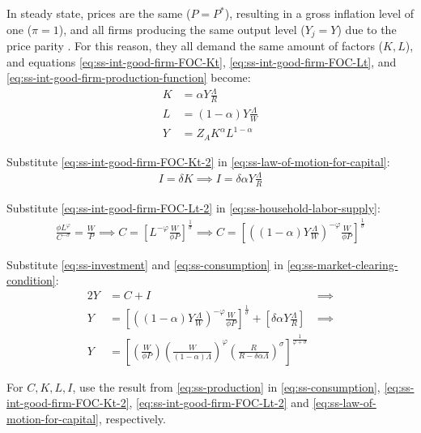 \documentclass[
thesis.tex
]{subfiles}
\begin{document}
	In steady state, prices are the same ($P = P^\ast$), resulting in a gross inflation level of one ($\pi=1$), and all firms producing the same output level ($Y_j=Y$) due to the price parity \cite[Lecture 13, p.12]{solis-garcia_ucb_2022}. For this reason, they all demand the same amount of factors ($K,L$), and equations \ref{eq:ss-int-good-firm-FOC-Kt}, \ref{eq:ss-int-good-firm-FOC-Lt}, and \ref{eq:ss-int-good-firm-production-function} become:
	\begin{align}
		K &= \alpha Y \frac{\Lambda}{R} \label{eq:ss-int-good-firm-FOC-Kt-2} \\
		L &= (1-\alpha) Y \frac{\Lambda}{W} \label{eq:ss-int-good-firm-FOC-Lt-2} \\
		Y &= Z_{A} K^\alpha L^{1-\alpha} \label{eq:ss-int-good-firm-production-function-2}
	\end{align}
	
	Substitute \ref{eq:ss-int-good-firm-FOC-Kt-2} in \ref{eq:ss-law-of-motion-for-capital}:
	\begin{align}
		\label{eq:ss-investment}
		I = \delta K \implies I = \delta \alpha Y \frac{\Lambda}{R}
	\end{align}
	
	Substitute \ref{eq:ss-int-good-firm-FOC-Lt-2} in \ref{eq:ss-household-labor-supply}:
	\begin{align}
		\label{eq:ss-consumption}
		\frac{\phi L^{\varphi}}{C^{-\sigma}} = \frac{W}{P}
		\implies
		C = \left[ L^{-\varphi} \frac{W}{\phi P} \right]^{\frac{1}{\sigma}}
		\implies
		C = \left[ \left( (1-\alpha) Y \frac{\Lambda}{W} \right)^{-\varphi} \frac{W}{\phi P} \right]^{\frac{1}{\sigma}}
	\end{align}
	
	Substitute \ref{eq:ss-investment} and \ref{eq:ss-consumption} in \ref{eq:ss-market-clearing-condition}:
	\begin{alignat}{2}
		Y &= C + I &\implies \nonumber \\
		Y &= \left[ \left( (1-\alpha) Y \frac{\Lambda}{W} \right)^{-\varphi} \frac{W}{\phi P} \right]^{\frac{1}{\sigma}} + \left[ \delta \alpha Y \frac{\Lambda}{R} \right] &\implies \nonumber \\
		Y &=\left[
		\left( \frac{W}{\phi P}                \right)
		\left( \frac{W}{(1-\alpha)\Lambda}     \right)^\varphi
		\left( \frac{R}{R-\delta\alpha\Lambda} \right)^\sigma
		\right]^\frac{1}{\varphi+\sigma} & \label{eq:ss-production}
	\end{alignat}
	
	For $C,K,L,I$, use the result from \ref{eq:ss-production} in \ref{eq:ss-consumption}, \ref{eq:ss-int-good-firm-FOC-Kt-2}, \ref{eq:ss-int-good-firm-FOC-Lt-2} and \ref{eq:ss-law-of-motion-for-capital}, respectively.
	
\end{document}

